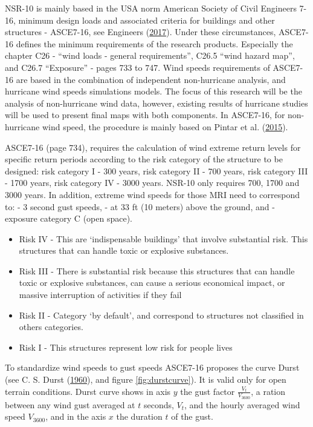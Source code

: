 \documentclass[12pt,oneside]{reedthesis}
\providecommand{\tightlist}{%
  \setlength{\itemsep}{0pt}\setlength{\parskip}{0pt}}
\begin{document}
NSR-10 is mainly based in the USA norm American Society of Civil Engineers 7-16, minimum design loads and associated criteria for buildings and other structures - ASCE7-16, see Engineers (\protect\hyperlink{ref-Asce2017}{2017}). Under these circumstances, ASCE7-16 defines the minimum requirements of the research products. Especially the chapter C26 - ``wind loads - general requirements'', C26.5 ``wind hazard map'', and C26.7 ``Exposure'' - pages 733 to 747. Wind speeds requirements of ASCE7-16 are based in the combination of independent non-hurricane analysis, and hurricane wind speeds simulations models. The focus of this research will be the analysis of non-hurricane wind data, however, existing results of hurricane studies will be used to present final maps with both components. In ASCE7-16, for non-hurricane wind speed, the procedure is mainly based on Pintar et al. (\protect\hyperlink{ref-Pintar2015}{2015}).

ASCE7-16 (page 734), requires the calculation of wind extreme return levels for specific return periods according to the risk category of the structure to be designed: risk category I - 300 years, risk category II - 700 years, risk category III - 1700 years, risk category IV - 3000 years. NSR-10 only requires 700, 1700 and 3000 years. In addition, extreme wind speeds for those MRI need to correspond to: - 3 second gust speeds, - at 33 ft (10 meters) above the ground, and - exposure category C (open space).
\begin{itemize}
\tightlist
\item
  Risk IV - This are `indispensable buildings' that involve substantial risk. This structures that can handle toxic or explosive substances.
\item
  Risk III - There is substantial risk because this structures that can handle toxic or explosive substances, can cause a serious economical impact, or massive interruption of activities if they fail
\item
  Risk II - Category `by default', and correspond to structures not classified in others categories.
\item
  Risk I - This structures represent low risk for people lives
\end{itemize}
To standardize wind speeds to gust speeds ASCE7-16 proposes the curve Durst (see C. S. Durst (\protect\hyperlink{ref-Durst1960}{1960}), and figure \ref{fig:durstcurve}). It is valid only for open terrain conditions. Durst curve shows in axis \(y\) the gust factor \(\frac{V_t}{V_{3600}}\), a ration between any wind gust averaged at \(t\) seconds, \(V_t\), and the hourly averaged wind speed \(V_{3600}\), and in the axis \(x\) the duration \(t\) of the gust.
\end{document}
